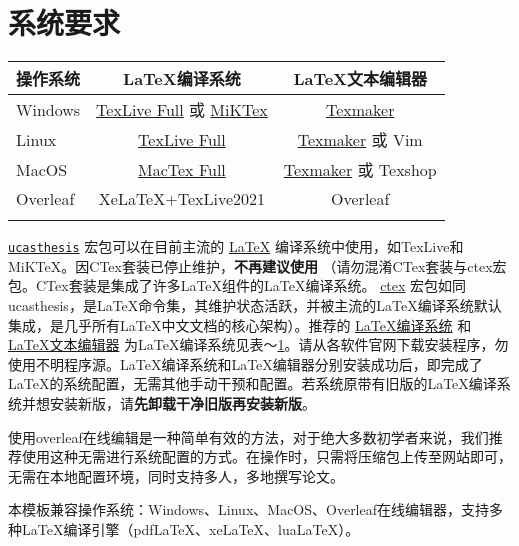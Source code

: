 \section{系统要求}\label{sec:system}
\begin{table}
    \footnotesize
    \setlength{\tabcolsep}{4pt}
    \renewcommand{\arraystretch}{1.5}
    \centering
    \begin{tabular}{lcc}
        \Xhline{3\arrayrulewidth} %
        操作系统 & LaTeX编译系统 & LaTeX文本编辑器\\
        \hline
        Windows & \href{https://www.tug.org/texlive/acquire-netinstall.html}{TexLive Full} 或 \href{https://miktex.org/download}{MiKTex} & \href{http://www.xm1math.net/texmaker/}{Texmaker}\\
        Linux & \href{https://www.tug.org/texlive/acquire-netinstall.html}{TexLive Full} & \href{http://www.xm1math.net/texmaker/}{Texmaker} 或 Vim\\
        MacOS & \href{https://www.tug.org/mactex/}{MacTex Full} & \href{http://www.xm1math.net/texmaker/}{Texmaker} 或 Texshop\\
        Overleaf & XeLaTeX+TexLive2021 & Overleaf \\
        \Xhline{3\arrayrulewidth} %
    \end{tabular}
    \label{tab:compiler}
\end{table}
\href{https://github.com/mohuangrui/ucasthesis}{\texttt{ucasthesis}} 宏包可以在目前主流的 \href{https://en.wikibooks.org/wiki/LaTeX/Introduction}{LaTeX} 编译系统中使用，如TexLive和MiKTeX。因CTex套装已停止维护，\textbf{不再建议使用} （请勿混淆CTex套装与ctex宏包。CTex套装是集成了许多LaTeX组件的LaTeX编译系统。 \href{https://ctan.org/pkg/ctex?lang=en}{ctex} 宏包如同ucasthesis，是LaTeX命令集，其维护状态活跃，并被主流的LaTeX编译系统默认集成，是几乎所有LaTeX中文文档的核心架构）。推荐的 \href{https://en.wikibooks.org/wiki/LaTeX/Installation}{LaTeX编译系统} 和 \href{https://en.wikibooks.org/wiki/LaTeX/Installation}{LaTeX文本编辑器} 为LaTeX编译系统见表～\ref{tab:compiler}。请从各软件官网下载安装程序，勿使用不明程序源。LaTeX编译系统和LaTeX编辑器分别安装成功后，即完成了LaTeX的系统配置，无需其他手动干预和配置。若系统原带有旧版的LaTeX编译系统并想安装新版，请\textbf{先卸载干净旧版再安装新版}。

使用overleaf在线编辑是一种简单有效的方法，对于绝大多数初学者来说，我们推荐使用这种无需进行系统配置的方式。在操作时，只需将压缩包上传至网站即可，无需在本地配置环境，同时支持多人，多地撰写论文。

本模板兼容操作系统：Windows、Linux、MacOS、Overleaf在线编辑器，支持多种LaTeX编译引擎（pdfLaTeX、xeLaTeX、luaLaTeX）。
